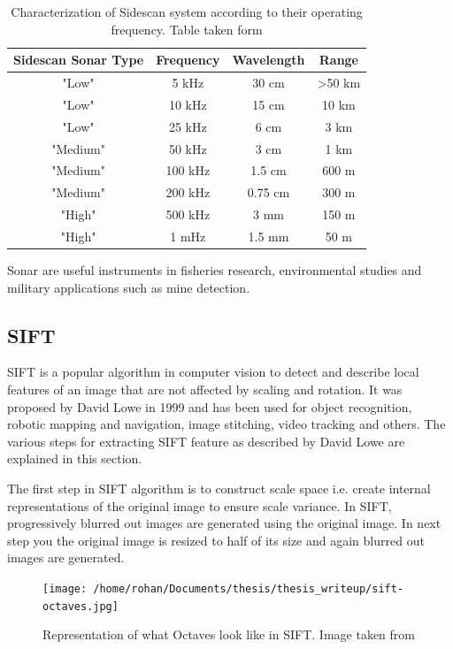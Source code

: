 \documentclass[12pt]{dalcsthesis}
\begin{document}
\begin{table}
\centering
\begin{tabular}{|c|c|c|c|}
\hline 
Sidescan Sonar Type & Frequency & Wavelength & Range \\ 
\hline 
"Low" & 5 kHz & 30 cm & >50 km \\ 
\hline 
"Low" & 10 kHz & 15 cm & 10 km \\ 
\hline 
"Low" & 25 kHz & 6 cm & 3 km \\ 
\hline 
"Medium" & 50 kHz & 3 cm & 1 km \\ 
\hline 
"Medium" & 100 kHz & 1.5 cm & 600 m \\ 
\hline 
"Medium" & 200 kHz & 0.75 cm & 300 m \\ 
\hline 
"High" & 500 kHz & 3 mm & 150 m \\ 
\hline 
"High" & 1 mHz & 1.5 mm & 50 m \\ 
\hline 
\end{tabular} 
\caption{\label{tab-: classification of side scan} Characterization of Sidescan system according to their operating frequency. Table taken form \cite{side_sonar_usgs_url}} 
\end{table}
Sonar are useful instruments in fisheries research, environmental studies and military applications such as mine detection. 



\subsection{SIFT}
SIFT is a popular algorithm in computer vision to detect and describe local features of an image that are not affected by scaling and rotation. It was proposed by David Lowe in 1999 \cite{lowe1999object} and has been used for object recognition, robotic mapping and navigation, image stitching, video tracking and others. The various steps for extracting SIFT feature as described by David Lowe are explained in this section.

The first step in SIFT algorithm is to construct scale space i.e. create internal representations of the original image to ensure scale variance. In SIFT, progressively blurred out images are generated using the original image. In next step you the original image is resized to half of its size and again blurred out images are generated. 

\begin{figure}
  \centering
     {\texttt{[image: /home/rohan/Documents/thesis/thesis\_writeup/sift-octaves.jpg]}}
  \caption{\label{fig- sift octaves} Representation of what Octaves look like in SIFT. Image taken from \cite{sift_url}}
\end{figure}
\end{document}

